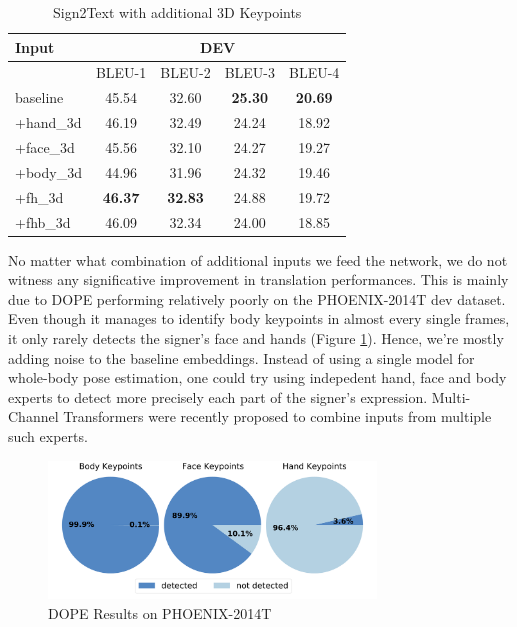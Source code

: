 \documentclass[final]{cvpr}
\begin{document}
\begin{table}[h]
	\centering
	\def\arraystretch{0.9}
	\begin{tabular}{l c c c c}
		\toprule
		Input &  \multicolumn{4}{c}{DEV}\\
		\midrule
		{}   & BLEU-1   & BLEU-2    & BLEU-3   & BLEU-4\\
		baseline  &  45.54 & 32.60  & \textbf{25.30}  & \textbf{20.69}\\
		+hand\_3d   &  46.19 & 32.49   & 24.24  & 18.92\\
		+face\_3d   &  45.56  &  32.10 & 24.27  & 19.27\\
		+body\_3d   &  44.96 &  31.96   & 24.32  & 19.46\\	
		+fh\_3d\footnotemark[3]  &  \textbf{46.37} &  \textbf{32.83}   & 24.88  & 19.72\\	
		+fhb\_3d\footnotemark[4]  &  46.09 &  32.34   & 24.00  & 18.85\\	
		\bottomrule
	\end{tabular}
	\vspace{-0.4\baselineskip}
	\caption{Sign2Text with additional 3D Keypoints}
	\label{tab:3d_keypoints}
\end{table}

No matter what combination of additional inputs we feed the network, we do not witness any significative improvement in translation performances. This is mainly due to DOPE performing relatively poorly on the PHOENIX-2014T dev dataset. Even though it manages to identify body keypoints in almost every single frames, it only rarely detects the signer's face and hands (Figure \ref{fig:pie_charts}). Hence, we're mostly adding noise to the baseline embeddings. 
Instead of using a single model for whole-body pose estimation, one could try using indepedent hand, face and body experts to detect more precisely each part of the signer's expression. Multi-Channel Transformers \cite{multi-channel} were recently proposed to combine inputs from multiple such experts.

\begin{figure}[H]
	\centering
	\includegraphics[width=8.7cm]{fig/keypoints.pdf}
	\vspace{-1.4\baselineskip}
	\caption{DOPE Results on  PHOENIX-2014T}
	\label{fig:pie_charts}
\end{figure} 
\end{document}

